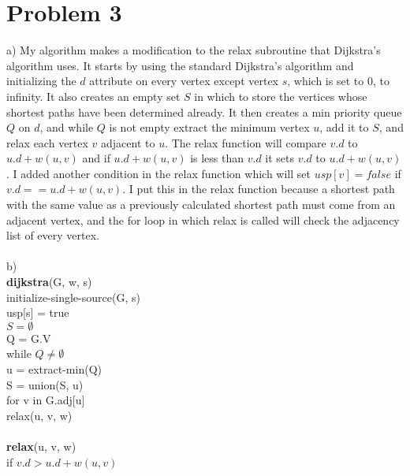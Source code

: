 \documentclass{article}
\begin{document}
\section*{Problem 3}
a) My algorithm makes a modification to the relax subroutine that Dijkstra's algorithm uses.  It starts by using the standard Dijkstra's algorithm and initializing the $d$ attribute on every vertex except vertex $s$, which is set to 0, to infinity.  It also creates an empty set $S$ in which to store the vertices whose shortest paths have been determined already.  It then creates a min priority queue $Q$ on $d$, and while $Q$ is not empty extract the minimum vertex $u$, add it to $S$, and relax each vertex $v$ adjacent to $u$.  The relax function will compare $v.d$ to $u.d + w(u,v)$ and if $u.d + w(u,v)$ is less than $v.d$ it sets $v.d$ to $u.d + w(u,v)$.  I added another condition in the relax function which will set $usp[v]=false$ if $v.d == u.d + w(u,v)$.  I put this in the relax function because a shortest path with the same value as a previously calculated shortest path must come from an adjacent vertex, and the for loop in which relax is called will check the adjacency list of every vertex.\\\\
b) \\
\textbf{dijkstra}(G, w, s)\\
\-\hspace{.5cm}initialize-single-source(G, s)\\
\-\hspace{.5cm}usp[s] = true\\
\-\hspace{.5cm}$S=\emptyset$\\
\-\hspace{.5cm}Q = G.V\\
\-\hspace{.5cm}while $Q \neq \emptyset$\\
\-\hspace{1cm}u = extract-min(Q)\\
\-\hspace{1cm}S = union(S, u)\\
\-\hspace{1cm}for v in G.adj[u]\\
\-\hspace{1.5cm}relax(u, v, w)\\\\
\textbf{relax}(u, v, w)\\
\-\hspace{.5cm}if $v.d > u.d + w(u, v)$\\
\end{document}
